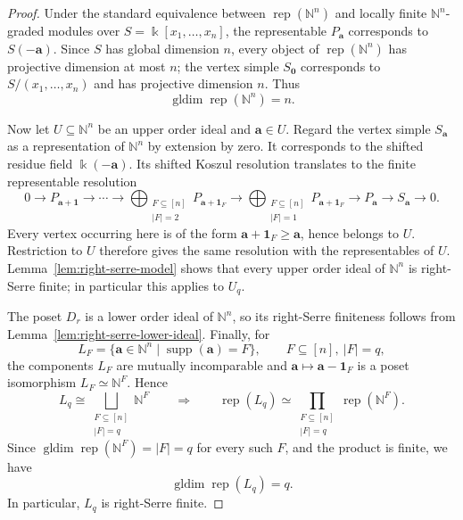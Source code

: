 \documentclass[12pt,reqno]{amsart}
\theoremstyle{definition}
\theoremstyle{remark}
\newcommand{\Rep}{\operatorname{rep}}
\begin{document}
\begin{proof}
Under the standard equivalence between $\Rep(\mathbb N^n)$ and locally finite
$\mathbb N^n$-graded modules over
$S=\Bbbk[x_1,\ldots,x_n]$, the representable $P_{\mathbf a}$ corresponds to
$S(-\mathbf a)$.  Since $S$ has global dimension $n$, every object of
$\Rep(\mathbb N^n)$ has projective dimension at most $n$; the vertex simple
$S_{\mathbf0}$ corresponds to $S/(x_1,\ldots,x_n)$ and has projective
dimension $n$.  Thus
\[
\operatorname{gldim}\Rep(\mathbb N^n)=n.
\]

Now let $U\subseteq\mathbb N^n$ be an upper order ideal and
$\mathbf a\in U$.  Regard the vertex simple $S_{\mathbf a}$ as a
representation of $\mathbb N^n$ by extension by zero.  It corresponds to the
shifted residue field $\Bbbk(-\mathbf a)$.  Its shifted Koszul resolution
translates to the finite representable resolution
\[
0\longrightarrow P_{\mathbf a+\mathbf1}
\longrightarrow\cdots\longrightarrow
\bigoplus_{\substack{F\subseteq[n]\\|F|=2}}P_{\mathbf a+\mathbf1_F}
\longrightarrow
\bigoplus_{\substack{F\subseteq[n]\\|F|=1}}P_{\mathbf a+\mathbf1_F}
\longrightarrow P_{\mathbf a}
\longrightarrow S_{\mathbf a}\longrightarrow0.
\]
Every vertex occurring here is of the form
$\mathbf a+\mathbf1_F\ge\mathbf a$, hence belongs to $U$.  Restriction to
$U$ therefore gives the same resolution with the representables of $U$.
Lemma~\ref{lem:right-serre-model} shows that every upper order ideal of
$\mathbb N^n$ is right-Serre finite; in particular this applies to $U_q$.

The poset $D_r$ is a lower order ideal of $\mathbb N^n$, so its
right-Serre finiteness follows from Lemma~\ref{lem:right-serre-lower-ideal}.
Finally, for
\[
L_F=\{\mathbf a\in\mathbb N^n\mid\operatorname{supp}(\mathbf a)=F\},
\qquad F\subseteq[n],\ |F|=q,
\]
the components $L_F$ are mutually incomparable and
$\mathbf a\mapsto\mathbf a-\mathbf1_F$ is a poset isomorphism
$L_F\simeq\mathbb N^F$.  Hence
\[
L_q\cong\bigsqcup_{\substack{F\subseteq[n]\\|F|=q}}\mathbb N^F
\qquad\Longrightarrow\qquad
\Rep(L_q)\simeq
\prod_{\substack{F\subseteq[n]\\|F|=q}}\Rep(\mathbb N^F).
\]
Since $\operatorname{gldim}\Rep(\mathbb N^F)=|F|=q$ for every such $F$,
and the product is finite, we have
\[
\operatorname{gldim}\Rep(L_q)=q.
\]
In particular, $L_q$ is right-Serre finite.
\end{proof}
\end{document}
